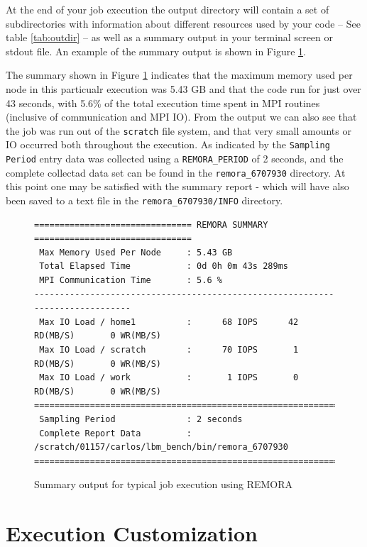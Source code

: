 \documentclass[10pt,a4paper]{report}
\begin{document}
At the end of your job execution the output directory will contain a set of subdirectories with information about different resources used by your code -- See table \ref{tab:outdir} -- as well as a summary output in your terminal screen or stdout file. An example of the summary output is shown in Figure \ref{fig:summary}.

The summary shown in Figure \ref{fig:summary} indicates that the maximum memory used per node in this particualr execution was 5.43 GB and that the code run for just over 43 seconds, with 5.6\% of the total execution time spent in MPI routines (inclusive of communication and MPI IO). From the output we can also see that the job was run out of the \verb+scratch+ file system, and that very small amounts or IO occurred both throughout the execution. As indicated by the \verb+Sampling Period+ entry data was collected using a \verb+REMORA_PERIOD+ of 2 seconds, and the complete collectad data set can be found in the \verb+remora_6707930+ directory. At this point one may be satisfied with the summary report - which will have also been saved to a text file in the \verb+remora_6707930/INFO+ directory.

\begin{figure}
\begin{verbatim}
=============================== REMORA SUMMARY ===============================
 Max Memory Used Per Node     : 5.43 GB
 Total Elapsed Time           : 0d 0h 0m 43s 289ms
 MPI Communication Time       : 5.6 %
------------------------------------------------------------------------------
 Max IO Load / home1          :      68 IOPS      42 RD(MB/S)       0 WR(MB/S)
 Max IO Load / scratch        :      70 IOPS       1 RD(MB/S)       0 WR(MB/S)
 Max IO Load / work           :       1 IOPS       0 RD(MB/S)       0 WR(MB/S)
==============================================================================
 Sampling Period              : 2 seconds
 Complete Report Data         : /scratch/01157/carlos/lbm_bench/bin/remora_6707930
==============================================================================
\end{verbatim}
\caption{Summary output for typical job execution using REMORA}
\label{fig:summary}
\end{figure}

\FloatBarrier
\section{Execution Customization}\label{customize}
\end{document}
